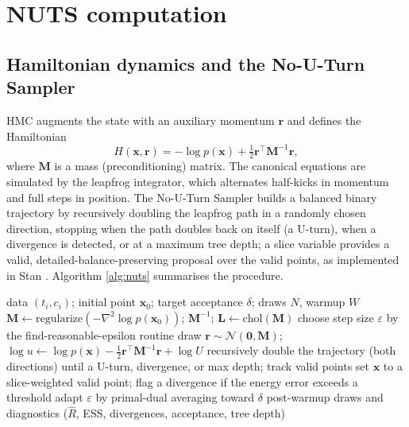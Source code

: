 \documentclass[ASNA,twocolumn]{USG}
\begin{document}
\section{NUTS computation}\label{sec:nuts}

\subsection{Hamiltonian dynamics and the No-U-Turn Sampler}\label{sec:hmc}
HMC augments the state with an auxiliary momentum $\bm r$ and defines the
Hamiltonian
\begin{equation}\label{eq:H}
H(\bm{x},\bm r)=-\log p(\bm{x})+\tfrac12\bm r^\top\bm M^{-1}\bm r,
\end{equation}
where $\bm M$ is a mass (preconditioning) matrix. The canonical equations
are simulated by the leapfrog integrator, which alternates half-kicks in
momentum and full steps in position. The No-U-Turn Sampler builds a
balanced binary trajectory by recursively doubling the leapfrog path in a
randomly chosen direction, stopping when the path doubles back on itself (a
U-turn), when a divergence is detected, or at a maximum tree depth; a
slice variable provides a valid, detailed-balance-preserving proposal over
the valid points, as implemented in Stan \cite{carpenter2017stan}. Algorithm
\ref{alg:nuts} summarises the procedure.

\begin{algorithm}[t]
\caption{NUTS for q-Weibull (competing risks), with Hessian mass and
dual-averaging step size}
\label{alg:nuts}
\begin{algorithmic}[1]
\Require data $(t_i,c_i)$; initial point $\bm x_0$; target acceptance
$\delta$; draws $N$, warmup $W$
\State $\bm M \gets \mathrm{regularize}(-\nabla^2\log p(\bm x_0))$;
$\bm M^{-1}$; $\bm L\gets\mathrm{chol}(\bm M)$
\State choose step size $\varepsilon$ by the find-reasonable-epsilon routine
  \State draw $\bm r\sim\mathcal{N}(\bm0,\bm M)$;
  $\log u\gets \log p(\bm x)-\tfrac12\bm r^\top\bm M^{-1}\bm r+\log U$
  \State recursively double the trajectory (both directions) until a
  U-turn, divergence, or max depth; track valid points
  \State set $\bm x$ to a slice-weighted valid point; flag a divergence if
  the energy error exceeds a threshold
    \State adapt $\varepsilon$ by primal-dual averaging toward $\delta$
  \EndIf
\EndFor
\State \Return post-warmup draws and diagnostics ($\hat R$, ESS,
divergences, acceptance, tree depth)
\end{algorithmic}
\end{algorithm}
\end{document}
